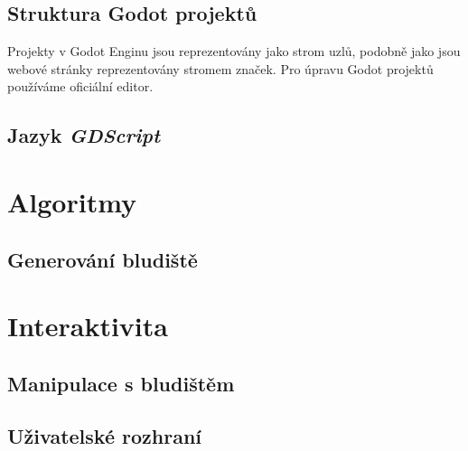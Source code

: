 \section{Struktura Godot projektů}

Projekty v Godot Enginu jsou reprezentovány jako strom uzlů, podobně jako jsou webové stránky reprezentovány stromem značek. Pro úpravu Godot projektů používáme oficiální editor.

\section{Jazyk \textit{GDScript}}

\chapter{Algoritmy}

\section{Generování bludiště}

\chapter{Interaktivita}

\section{Manipulace s bludištěm}

\section{Uživatelské rozhraní}
